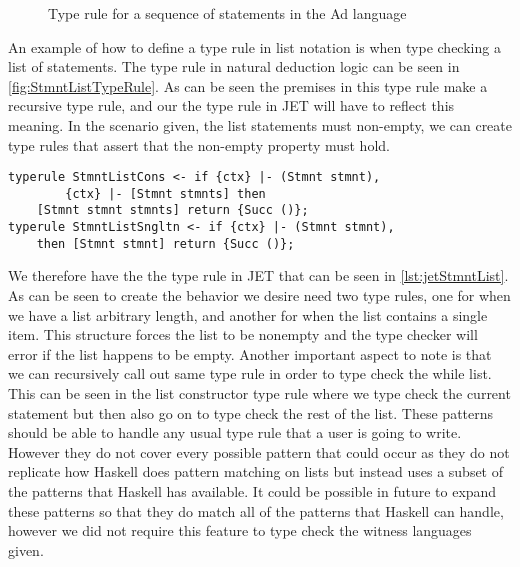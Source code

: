 \begin{figure}
    \begin{prooftree}
    \end{prooftree}
    \caption{Type rule for a sequence of statements in the Ad language}
    \label{fig:StmntListTypeRule}
\end{figure}

An example of how to define a type rule in list notation is when type checking a list of statements.
The type rule in natural deduction logic can be seen in \autoref{fig:StmntListTypeRule}.
As can be seen the premises in this type rule make a recursive type rule, and our the type rule in JET will have to reflect this meaning.
In the scenario given, the list statements must non-empty, we can create type rules that assert that the non-empty property must hold.

\begin{lstlisting}[caption = Type rule in JET for a seqeunce of statements, label=lst:jetStmntList]
typerule StmntListCons <- if {ctx} |- (Stmnt stmnt), 
        {ctx} |- [Stmnt stmnts] then 
    [Stmnt stmnt stmnts] return {Succ ()};
typerule StmntListSngltn <- if {ctx} |- (Stmnt stmnt),
    then [Stmnt stmnt] return {Succ ()};
\end{lstlisting}

We therefore have the the type rule in JET that can be seen in \autoref{lst:jetStmntList}.
As can be seen to create the behavior we desire need two type rules, one for when we have a list arbitrary length, and another for when the list contains a single item.
This structure forces the list to be nonempty and the type checker will error if the list happens to be empty.
Another important aspect to note is that we can recursively call out same type rule in order to type check the while list.
This can be seen in the list constructor type rule where we type check the current statement but then also go on to type check the rest of the list.
These patterns should be able to handle any usual type rule that a user is going to write.
However they do not cover every possible pattern that could occur as they do not replicate how Haskell does pattern matching on lists but instead uses a subset of the patterns that Haskell has available.
It could be possible in future to expand these patterns so that they do match all of the patterns that Haskell can handle, however we did not require this feature to type check the witness languages given.